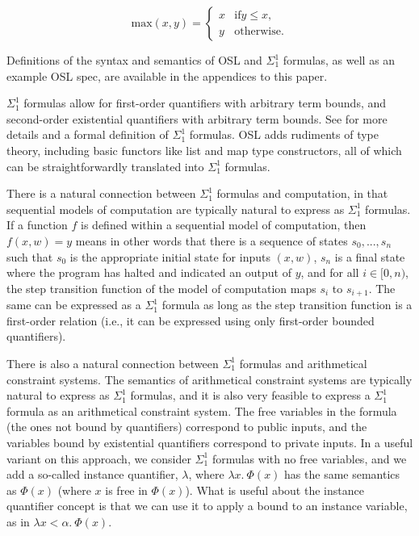 \documentclass[11pt]{article}
\begin{document}
\begin{equation}
	\text{max}(x, y) = \begin{cases}
		x & \text{if} y \leq x, \\
		y & \text{otherwise}.
	\end{cases}
\end{equation}

Definitions of the syntax and semantics of OSL and $\Sigma^1_1$ formulas, as well as an example OSL spec, are available in the appendices to this paper.

$\Sigma^1_1$ formulas allow for first-order quantifiers with arbitrary term bounds, and second-order existential quantifiers with arbitrary term bounds. See \cite{sigma11-poly-bounds} for more details and a formal definition of $\Sigma^1_1$ formulas. OSL adds rudiments of type theory, including basic functors like list and map type constructors, all of which can be straightforwardly translated into $\Sigma^1_1$ formulas.

There is a natural connection between $\Sigma^1_1$ formulas and computation, in that sequential models of computation are typically natural to express as $\Sigma^1_1$ formulas. If a function $f$ is defined within a sequential model of computation, then $f(x, w) = y$ means in other words that there is a sequence of states $s_0, ..., s_n$ such that $s_0$ is the appropriate initial state for inputs $(x, w)$, $s_n$ is a final state where the program has halted and indicated an output of $y$, and for all $i \in [0, n)$, the step transition function of the model of computation maps $s_i$ to $s_{i+1}$. The same can be expressed as a $\Sigma^1_1$ formula as long as the step transition function is a first-order relation (i.e., it can be expressed using only first-order bounded quantifiers).

There is also a natural connection between $\Sigma^1_1$ formulas and arithmetical constraint systems. The semantics of arithmetical constraint systems are typically natural to express as $\Sigma^1_1$ formulas, and it is also very feasible to express a $\Sigma^1_1$ formula as an arithmetical constraint system. The free variables in the formula (the ones not bound by quantifiers) correspond to public inputs, and the variables bound by existential quantifiers correspond to private inputs. In a useful variant on this approach, we consider $\Sigma^1_1$ formulas with no free variables, and we add a so-called instance quantifier, $\lambda$, where $\lambda x.\ \Phi(x)$ has the same semantics as $\Phi(x)$ (where $x$ is free in $\Phi(x)$). What is useful about the instance quantifier concept is that we can use it to apply a bound to an instance variable, as in $\lambda x < \alpha.\ \Phi(x)$.
\end{document}
